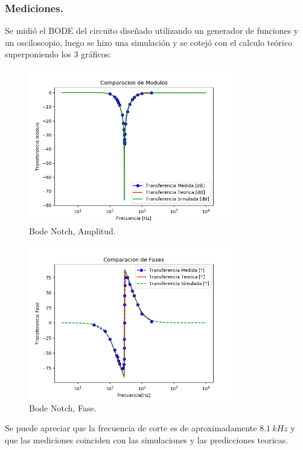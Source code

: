 \documentclass[a4paper]{article}
\begin{document}
\subsubsection{Mediciones.}
Se midió el BODE del circuito diseñado utilizando un generador de funciones y un osciloscopio, luego se hizo una simulación y se cotejó con el calculo teórico superponiendo los 3 gráficos:
\begin{figure}[H]
	\centering
	\includegraphics[width=0.8\textwidth, trim={0 0.1cm  0 0},clip]{BodeNotchAmp.png}
\caption{Bode Notch, Amplitud.}
	\label{fig:BodeNotchAmp}
\end{figure}
\begin{figure}[H]
	\centering
	\includegraphics[width=0.8\textwidth, trim={0 0.1cm  0 0},clip]{BodeNotchPhase.png}
\caption{Bode Notch, Fase.}
	\label{fig:BodeNotchPhase}
\end{figure}
Se puede apreciar que la frecuencia de corte es de aproximadamente $8.1 \ kHz$ y que las mediciones coinciden con las simulaciones y las predicciones teoricas.
\end{document}
